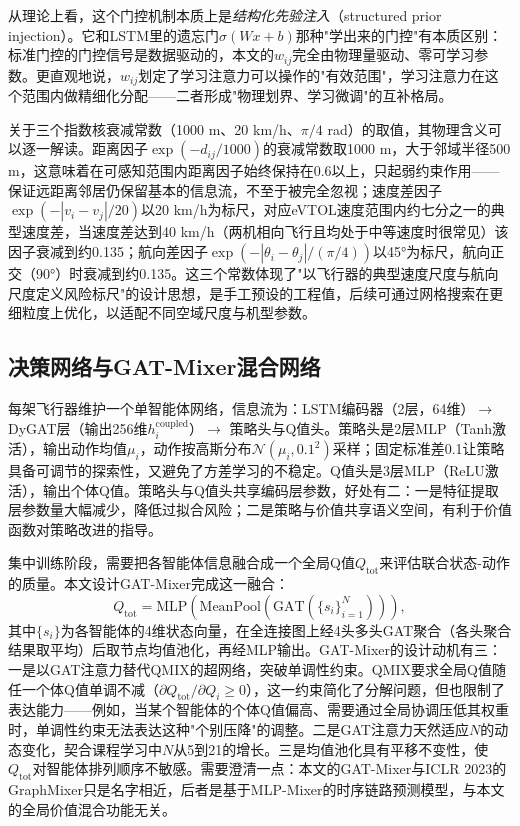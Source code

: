 \documentclass[12pt,a4paper,UTF8]{ctexart}
\begin{document}
从理论上看，这个门控机制本质上是\emph{结构化先验注入}（structured prior injection）。它和LSTM里的遗忘门$\sigma(Wx+b)$那种"学出来的门控"有本质区别：标准门控的门控信号是数据驱动的，本文的$w_{ij}$完全由物理量驱动、零可学习参数。更直观地说，$w_{ij}$划定了学习注意力可以操作的"有效范围"，学习注意力在这个范围内做精细化分配——二者形成"物理划界、学习微调"的互补格局。

关于三个指数核衰减常数（1000 m、20 km/h、$\pi/4$ rad）的取值，其物理含义可以逐一解读。距离因子$\exp(-d_{ij}/1000)$的衰减常数取1000 m，大于邻域半径500 m，这意味着在可感知范围内距离因子始终保持在0.6以上，只起弱约束作用——保证远距离邻居仍保留基本的信息流，不至于被完全忽视；速度差因子$\exp(-|v_i-v_j|/20)$以20 km/h为标尺，对应eVTOL速度范围内约七分之一的典型速度差，当速度差达到40 km/h（两机相向飞行且均处于中等速度时很常见）该因子衰减到约0.135；航向差因子$\exp(-|\theta_i-\theta_j|/(\pi/4))$以45°为标尺，航向正交（90°）时衰减到约0.135。这三个常数体现了"以飞行器的典型速度尺度与航向尺度定义风险标尺"的设计思想，是手工预设的工程值，后续可通过网格搜索在更细粒度上优化，以适配不同空域尺度与机型参数。

\subsection{决策网络与GAT-Mixer混合网络}

每架飞行器维护一个单智能体网络，信息流为：LSTM编码器（2层，64维）$\to$ DyGAT层（输出256维$h_i^{\text{coupled}}$）$\to$ 策略头与Q值头。策略头是2层MLP（Tanh激活），输出动作均值$\mu_i$，动作按高斯分布$\mathcal{N}(\mu_i, 0.1^2)$采样；固定标准差0.1让策略具备可调节的探索性，又避免了方差学习的不稳定。Q值头是3层MLP（ReLU激活），输出个体Q值。策略头与Q值头共享编码层参数，好处有二：一是特征提取层参数量大幅减少，降低过拟合风险；二是策略与价值共享语义空间，有利于价值函数对策略改进的指导。

集中训练阶段，需要把各智能体信息融合成一个全局Q值$Q_{\text{tot}}$来评估联合状态-动作的质量。本文设计GAT-Mixer完成这一融合：
\begin{equation}
    Q_{\text{tot}} = \text{MLP}\!\left(\text{MeanPool}\!\left(\text{GAT}\left(\{s_i\}_{i=1}^{N}\right)\right)\right),
    \label{eq:gat_mixer}
\end{equation}
其中$\{s_i\}$为各智能体的4维状态向量，在全连接图上经4头多头GAT聚合（各头聚合结果取平均）后取节点均值池化，再经MLP输出。GAT-Mixer的设计动机有三：一是以GAT注意力替代QMIX的超网络，突破单调性约束。QMIX要求全局Q值随任一个体Q值单调不减（$\partial Q_{\text{tot}}/\partial Q_i\geq0$），这一约束简化了分解问题，但也限制了表达能力——例如，当某个智能体的个体Q值偏高、需要通过全局协调压低其权重时，单调性约束无法表达这种"个别压降"的调整。二是GAT注意力天然适应$N$的动态变化，契合课程学习中$N$从5到21的增长。三是均值池化具有平移不变性，使$Q_{\text{tot}}$对智能体排列顺序不敏感。需要澄清一点：本文的GAT-Mixer与ICLR 2023的GraphMixer\cite{ref28}只是名字相近，后者是基于MLP-Mixer的时序链路预测模型，与本文的全局价值混合功能无关。
\end{document}
